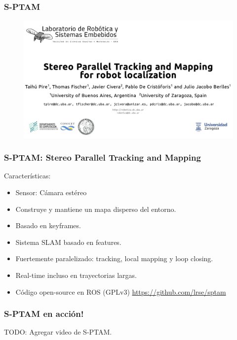 \documentclass[compress]{beamer}
\begin{document}
\begin{frame}
	\frametitle{S-PTAM}
	\begin{figure}[htb]
		\centering
		\includegraphics[width=1.0\columnwidth]{method/portada-sptam-kitti-video.pdf}
		\hfill
	\end{figure}

\end{frame}


\begin{frame}
    \frametitle{S-PTAM: Stereo Parallel Tracking and Mapping}
    Características:
    \begin{itemize}
    	\item Sensor: Cámara estéreo
		\item Construye y mantiene un mapa disperso del entorno.
		\item Basado en keyframes.
        \item Sistema SLAM basado en features.
        \item Fuertemente paralelizado: tracking, local mapping y loop closing.
        \item Real-time incluso en trayectorias largas.
        \item Código open-source en ROS (GPLv3) \url{https://github.com/lrse/sptam}
    \end{itemize}
\end{frame}


\begin{frame}
    \frametitle{S-PTAM en acción!}
    TODO: Agregar video de S-PTAM.
\end{frame}
\end{document}
